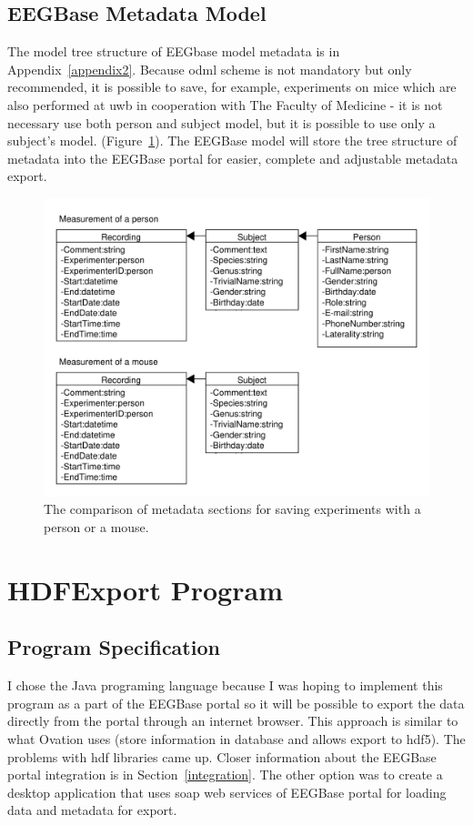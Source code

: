 \subsection{EEGBase Metadata Model}
The model tree structure of EEGbase model metadata is in Appendix~\ref{appendix2}. Because \gls{odml} scheme is not mandatory but only recommended, it is possible to save, for example, experiments on mice which are also performed at \gls{uwb} in cooperation with The Faculty of Medicine - it is not necessary use both person and subject model, but it is possible to use only a subject's model. (Figure~\ref{person_vs_mouse}). The EEGBase model will store the tree structure of metadata into the EEGBase portal for easier, complete and adjustable metadata export.
\begin{figure}[h]
	\includegraphics[scale=0.6]{obrazky/person_vs_mouse.pdf}	
	\caption{The comparison of metadata sections for saving experiments with a person or a mouse.}
	\label{person_vs_mouse}
\end{figure}
\newpage
\section{HDFExport Program}
\subsection{Program Specification}
I chose the Java programing language because I was hoping to implement this program as a part of the EEGBase portal so it will be possible to export the data directly from the portal through an internet browser. This approach is similar to what Ovation uses (store information in database and allows export to \gls{hdf5}). The problems with \gls{hdf} libraries came up. Closer information about the EEGBase portal integration is in Section~\ref{integration}. The other option was to create a desktop application that uses \gls{soap} web services of EEGBase portal for loading data and metadata for export.

